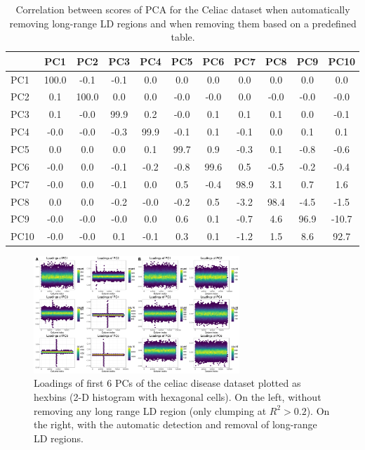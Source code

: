 \documentclass{bioinfo}
\begin{document}
\begin{table}[ht]
\centering
\begin{tabular}{l|cccccccccc}
  \hline
 & PC1 & PC2 & PC3 & PC4 & PC5 & PC6 & PC7 & PC8 & PC9 & PC10 \\
  \hline
PC1 & 100.0 & -0.1 & -0.1 & 0.0 & 0.0 & 0.0 & 0.0 & 0.0 & 0.0 & 0.0 \\
  PC2 & 0.1 & 100.0 & 0.0 & 0.0 & -0.0 & -0.0 & 0.0 & -0.0 & -0.0 & -0.0 \\
  PC3 & 0.1 & -0.0 & 99.9 & 0.2 & -0.0 & 0.1 & 0.1 & 0.1 & 0.0 & -0.1 \\
  PC4 & -0.0 & -0.0 & -0.3 & 99.9 & -0.1 & 0.1 & -0.1 & 0.0 & 0.1 & 0.1 \\
  PC5 & 0.0 & 0.0 & 0.0 & 0.1 & 99.7 & 0.9 & -0.3 & 0.1 & -0.8 & -0.6 \\
  PC6 & -0.0 & 0.0 & -0.1 & -0.2 & -0.8 & 99.6 & 0.5 & -0.5 & -0.2 & -0.4 \\
  PC7 & -0.0 & 0.0 & -0.1 & 0.0 & 0.5 & -0.4 & 98.9 & 3.1 & 0.7 & 1.6 \\
  PC8 & 0.0 & 0.0 & -0.2 & -0.0 & -0.2 & 0.5 & -3.2 & 98.4 & -4.5 & -1.5 \\
  PC9 & -0.0 & -0.0 & -0.0 & 0.0 & 0.6 & 0.1 & -0.7 & 4.6 & 96.9 & -10.7 \\
  PC10 & -0.0 & -0.0 & 0.1 & -0.1 & 0.3 & 0.1 & -1.2 & 1.5 & 8.6 & 92.7 \\
   \hline
\end{tabular}
\caption{Correlation between scores of PCA for the Celiac dataset  when automatically removing long-range LD regions and when removing them based on a predefined table.}
\label{tab:pc-popres}
\end{table}

\begin{figure}[!tpb]
\centerline{\includegraphics[width=220pt]{loadings}}
\caption{Loadings of first 6 PCs of the celiac disease dataset plotted as hexbins (2-D histogram with hexagonal cells). On the left, without removing any long range LD region (only clumping at $R^2 > 0.2$). On the right, with the automatic detection and removal of long-range LD regions.}\label{fig:loadings}
\end{figure}
\end{document}
